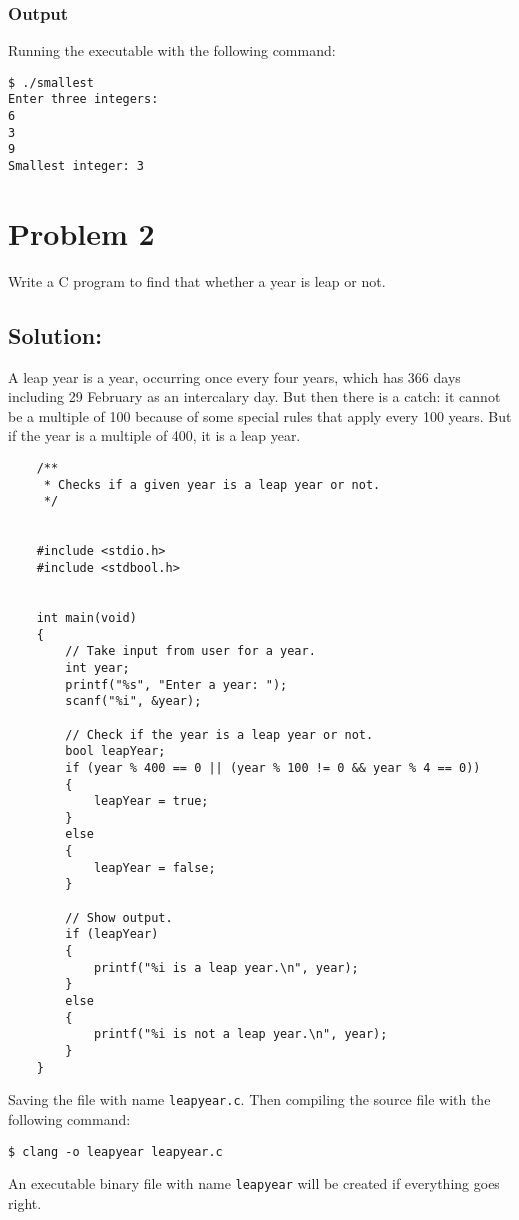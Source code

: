 \documentclass[12pt, letterpaper]{report}
\begin{document}
\subsubsection*{Output}
Running the executable with the following command:
\begin{verbatim}
$ ./smallest
Enter three integers:
6
3
9
Smallest integer: 3
\end{verbatim}

\section*{Problem 2}
{\large Write a C program to find that whether a year is leap or
not.}

\subsection*{Solution:}
A leap year is a year, occurring once every four years, which has 366 days including 29 February as an intercalary day.
But then there is a catch: it cannot be a multiple of 100 because of some special rules that apply every 100 years.
But if the year is a multiple of 400, it is a leap year.

\begin{verbatim}
    /**
     * Checks if a given year is a leap year or not.
     */


    #include <stdio.h>
    #include <stdbool.h>


    int main(void)
    {
        // Take input from user for a year.
        int year;
        printf("%s", "Enter a year: ");
        scanf("%i", &year);

        // Check if the year is a leap year or not.
        bool leapYear;
        if (year % 400 == 0 || (year % 100 != 0 && year % 4 == 0))  
        {
            leapYear = true;
        }
        else 
        {
            leapYear = false;
        }

        // Show output.
        if (leapYear)
        {
            printf("%i is a leap year.\n", year);
        }
        else
        {
            printf("%i is not a leap year.\n", year);
        }
    }

\end{verbatim}
Saving the file with name \texttt{leapyear.c}. Then compiling the source file with the following command:
\begin{verbatim}
$ clang -o leapyear leapyear.c
\end{verbatim}
An executable binary file with name \texttt{leapyear} will be created if everything goes right.
\end{document}
